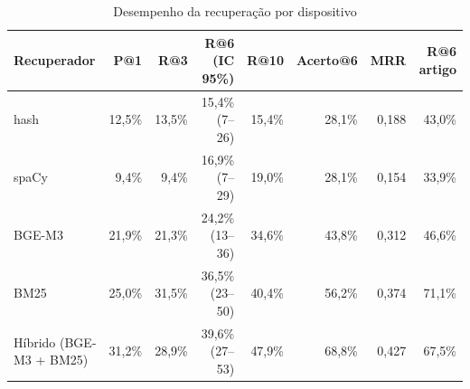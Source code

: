 \begin{table}[htbp]
\caption{Desempenho da recuperação por dispositivo}\label{tab:recuperacao}
\centering\footnotesize
\setlength{\tabcolsep}{4pt}
\begin{tabular}{lrrrrrrr}
\toprule
Recuperador & P@1 & R@3 & R@6 (IC 95\%) & R@10 & Acerto@6 & MRR & R@6 artigo \\
\midrule
hash & 12,5\% & 13,5\% & 15,4\% (7--26) & 15,4\% & 28,1\% & 0,188 & 43,0\% \\
spaCy & 9,4\% & 9,4\% & 16,9\% (7--29) & 19,0\% & 28,1\% & 0,154 & 33,9\% \\
BGE-M3 & 21,9\% & 21,3\% & 24,2\% (13--36) & 34,6\% & 43,8\% & 0,312 & 46,6\% \\
BM25 & 25,0\% & 31,5\% & 36,5\% (23--50) & 40,4\% & 56,2\% & 0,374 & 71,1\% \\
Híbrido (BGE-M3 + BM25) & 31,2\% & 28,9\% & 39,6\% (27--53) & 47,9\% & 68,8\% & 0,427 & 67,5\% \\
\bottomrule
\end{tabular}
\end{table}
